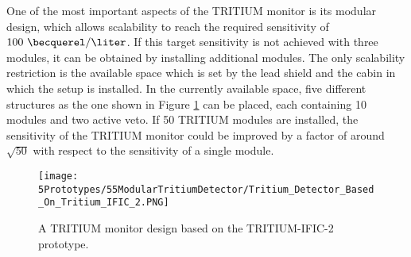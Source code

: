 One of the most important aspects of the TRITIUM monitor is its modular design, which allows scalability to reach the required sensitivity of $100~\becquerel/\liter$. If this target sensitivity is not achieved with three modules, it can be obtained by installing additional modules. The only scalability restriction is the available space which is set by the lead shield and the cabin in which the setup is installed. In the currently available space, five different structures as the one shown in Figure \ref{fig:TritiumMonitorIFIC2Design} can be placed, each containing 10 modules and two active veto. If 50 TRITIUM modules are installed, the sensitivity of the TRITIUM monitor could be improved by a factor of around $\sqrt{50}$ with respect to the sensitivity of a single module.

\begin{figure}[h]
\centering
\texttt{[image: 5Prototypes/55ModularTritiumDetector/Tritium\_Detector\_Based\_On\_Tritium\_IFIC\_2.PNG]}
\caption{A TRITIUM monitor design based on the TRITIUM-IFIC-2 prototype.\label{fig:TritiumMonitorIFIC2Design}}
\end{figure}